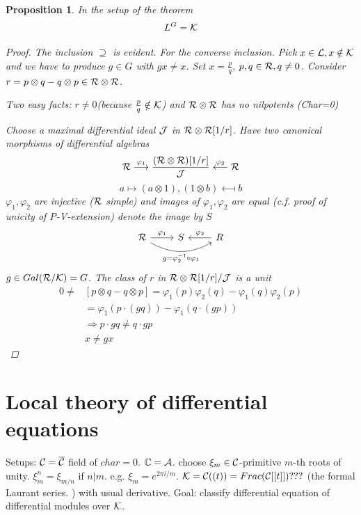 \documentclass[11pt]{article}
\newtheorem{prop}[thm]{Proposition}
\newcommand{\cplx}{\mathbb C}
\newcommand{\cala}{{\cal A}}
\newcommand{\calc}{{\cal C}}
\newcommand{\calj}{{\cal J}}
\newcommand{\calk}{{\cal K}}
\newcommand{\call}{{\cal L}}
\newcommand{\calr}{{\cal R}}
\newcommand{\Lrta}{\Longrightarrow}
\newcommand{\lrta}{\longrightarrow}
\begin{document}
\begin{prop}
In the setup of the theorem
$$
L^G=\calk
$$
\begin{proof}
The inclusion $\supseteq$ is evident. For the converse inclusion. Pick $x\in \call,x\notin\calk$ and we have to produce $g\in G$ with $gx\neq x$. Set $x=\frac{p}{q}$, $p,q\in\calr,q\neq 0$. Consider $r=p\otimes q-q\otimes p\in\calr\otimes\calr$. 

Two easy facts:
$r\neq 0$(because $\frac{p}{q}\notin\calk$) and $\calr\otimes \calr$ has no nilpotents (Char=0)

Choose a maximal differential ideal $\calj$ in $\calr\otimes\calr[1/r]$. Have two canonical morphisms of differential algebras
$$
\calr\overset{\varphi_1}{\lrta} \frac{(\calr\otimes\calr)[1/r]}{\calj}\overset{\varphi_2}{\longleftarrow}\calr
$$
$$
a\longmapsto (a\otimes1),(1\otimes b)\longmapsfrom b
$$
$\varphi_1,\varphi_2$ are injective ($\calr$ simple) and images of $\varphi_1,\varphi_2$ are equal (c.f. proof of unicity of P-V-extension) denote the image by $S$
\[
\begin{tikzcd}
\calr\ar[r,"\varphi_1"]\ar[rr,swap,bend right,"g=\varphi^{-1}_2\circ \varphi_1"] & S & R\ar[l,swap,"\varphi_2"]
\end{tikzcd}
\]
$g\in Gal(\calr/\calk)=G$. The class of $r$ in $\calr\otimes\calr[1/r]/\calj$ is a unit 
$$
\begin{aligned}
0\neq &[p\otimes q-q\otimes p]=\varphi_1(p)\varphi_2(q)-\varphi_1(q)\varphi_2(p)\\
&= \varphi_1(p\cdot(g q))-\varphi_1(q\cdot(g p))\\
&\Lrta p \cdot g q \neq q \cdot g p\\
& x\neq g x
\end{aligned}
$$
\end{proof}
\end{prop}

\section{Local theory of differential equations}
Setups: $\calc=\overline{\calc}$ field of $char=0$. $\cplx=\cala$. choose $\xi_m\in\calc$-primitive $m$-th roots of unity. $\xi_m^n=\xi_{m/n}$ if $n|m.$ e.g. $\xi_m=e^{2\pi i/m}$. $\calk=\calc((t))=Frac( \calc[[t]])???$ (the formal Laurant series. ) with usual derivative. Goal: classify differential equation of differential modules over $\calk$. 
\end{document}
